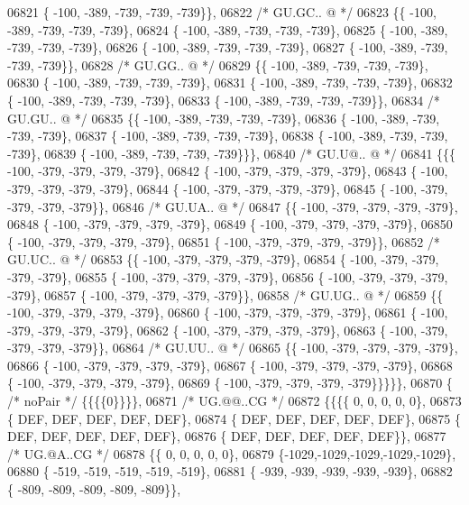 \begin{DoxyCode}
06821 \{ -100, -389, -739, -739, -739\}\},
06822 \textcolor{comment}{/* GU.GC.. @ */}
06823 \{\{ -100, -389, -739, -739, -739\},
06824 \{ -100, -389, -739, -739, -739\},
06825 \{ -100, -389, -739, -739, -739\},
06826 \{ -100, -389, -739, -739, -739\},
06827 \{ -100, -389, -739, -739, -739\}\},
06828 \textcolor{comment}{/* GU.GG.. @ */}
06829 \{\{ -100, -389, -739, -739, -739\},
06830 \{ -100, -389, -739, -739, -739\},
06831 \{ -100, -389, -739, -739, -739\},
06832 \{ -100, -389, -739, -739, -739\},
06833 \{ -100, -389, -739, -739, -739\}\},
06834 \textcolor{comment}{/* GU.GU.. @ */}
06835 \{\{ -100, -389, -739, -739, -739\},
06836 \{ -100, -389, -739, -739, -739\},
06837 \{ -100, -389, -739, -739, -739\},
06838 \{ -100, -389, -739, -739, -739\},
06839 \{ -100, -389, -739, -739, -739\}\}\},
06840 \textcolor{comment}{/* GU.U@.. @ */}
06841 \{\{\{ -100, -379, -379, -379, -379\},
06842 \{ -100, -379, -379, -379, -379\},
06843 \{ -100, -379, -379, -379, -379\},
06844 \{ -100, -379, -379, -379, -379\},
06845 \{ -100, -379, -379, -379, -379\}\},
06846 \textcolor{comment}{/* GU.UA.. @ */}
06847 \{\{ -100, -379, -379, -379, -379\},
06848 \{ -100, -379, -379, -379, -379\},
06849 \{ -100, -379, -379, -379, -379\},
06850 \{ -100, -379, -379, -379, -379\},
06851 \{ -100, -379, -379, -379, -379\}\},
06852 \textcolor{comment}{/* GU.UC.. @ */}
06853 \{\{ -100, -379, -379, -379, -379\},
06854 \{ -100, -379, -379, -379, -379\},
06855 \{ -100, -379, -379, -379, -379\},
06856 \{ -100, -379, -379, -379, -379\},
06857 \{ -100, -379, -379, -379, -379\}\},
06858 \textcolor{comment}{/* GU.UG.. @ */}
06859 \{\{ -100, -379, -379, -379, -379\},
06860 \{ -100, -379, -379, -379, -379\},
06861 \{ -100, -379, -379, -379, -379\},
06862 \{ -100, -379, -379, -379, -379\},
06863 \{ -100, -379, -379, -379, -379\}\},
06864 \textcolor{comment}{/* GU.UU.. @ */}
06865 \{\{ -100, -379, -379, -379, -379\},
06866 \{ -100, -379, -379, -379, -379\},
06867 \{ -100, -379, -379, -379, -379\},
06868 \{ -100, -379, -379, -379, -379\},
06869 \{ -100, -379, -379, -379, -379\}\}\}\}\},
06870 \{ \textcolor{comment}{/* noPair */} \{\{\{\{0\}\}\}\},
06871 \textcolor{comment}{/* UG.@@..CG */}
06872 \{\{\{\{    0,    0,    0,    0,    0\},
06873 \{  DEF,  DEF,  DEF,  DEF,  DEF\},
06874 \{  DEF,  DEF,  DEF,  DEF,  DEF\},
06875 \{  DEF,  DEF,  DEF,  DEF,  DEF\},
06876 \{  DEF,  DEF,  DEF,  DEF,  DEF\}\},
06877 \textcolor{comment}{/* UG.@A..CG */}
06878 \{\{    0,    0,    0,    0,    0\},
06879 \{-1029,-1029,-1029,-1029,-1029\},
06880 \{ -519, -519, -519, -519, -519\},
06881 \{ -939, -939, -939, -939, -939\},
06882 \{ -809, -809, -809, -809, -809\}\},

\end{DoxyCode}
